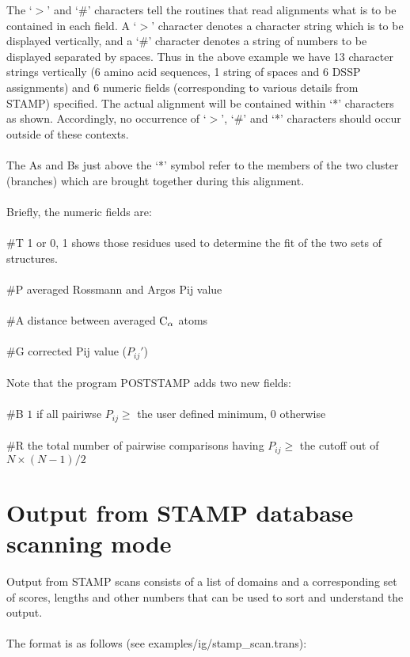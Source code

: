     The `$>$' and `\#' characters tell the routines that read alignments
    what is to be contained in each field.  A `$>$' character denotes a
    character string which is to be displayed vertically, and a `\#'
    character denotes a string of numbers to be displayed separated by
    spaces.  Thus in the above example we have 13 character strings
    vertically (6 amino acid sequences, 1 string of spaces and 6 DSSP
    assignments) and 6 numeric fields (corresponding to various details
    from STAMP) specified.  The actual alignment will be contained
    within `*' characters as shown.  Accordingly, no occurrence of `$>$',
    `\#' and `*' characters should occur outside of these contexts.\\
    \\
    The As and Bs just above the `*' symbol  
    refer to the members of the two cluster (branches) 
    which are brought together during this alignment.\\
    \\
    Briefly, the numeric fields are:\\
    \\
    \#T  1 or 0, 1 shows those residues used to 
    determine the fit of the two sets of structures.\\
    \\
    \#P  averaged Rossmann and Argos Pij value\\
    \\
    \#A  distance between averaged ${\rm C}_{\alpha}$ atoms\\
    \\
    \#G  corrected Pij value ($P_{ij}{\prime}$)\\
    \\
    Note that the program POSTSTAMP adds two new fields:\\
    \\
    \#B  $1$ if all pairiwse $P_{ij} \geq$  the user defined minimum, $0$ otherwise\\
    \\
    \#R  the total number of pairwise comparisons having $P_{ij} \geq $ the cutoff out of $N\times(N-1)/2$

    \section{Output from STAMP database scanning mode}

    Output from STAMP scans consists of a list of domains and a 
    corresponding set of scores, lengths and other numbers that can be 
    used to sort and understand the output.\\
    \\
    The format is as follows (see examples/ig/stamp\_scan.trans):\\

